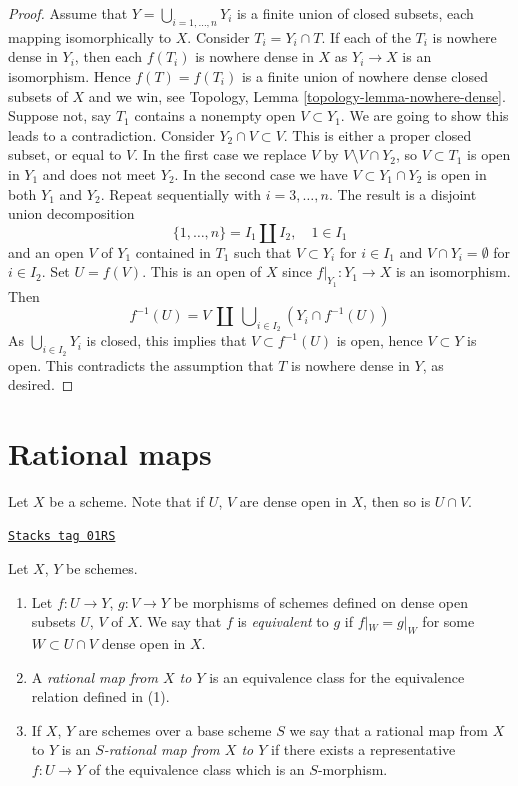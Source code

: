 \begin{proof}
\medskip\noindent
Assume that $Y = \bigcup_{i = 1, \ldots, n} Y_i$ is a finite union of
closed subsets, each mapping isomorphically to $X$. Consider
$T_i = Y_i \cap T$. If each of the $T_i$ is nowhere dense in $Y_i$,
then each $f(T_i)$ is nowhere dense in $X$ as $Y_i \to X$ is an isomorphism.
Hence $f(T) = f(T_i)$ is a finite union of nowhere dense closed
subsets of $X$ and we win, see
Topology, Lemma \ref{topology-lemma-nowhere-dense}.
Suppose not, say $T_1$ contains a nonempty open $V \subset Y_1$.
We are going to show this leads to a contradiction.
Consider $Y_2 \cap V \subset V$. This is either
a proper closed subset, or equal to $V$. In the first case we replace
$V$ by $V \setminus V \cap Y_2$, so $V \subset T_1$ is open in $Y_1$ and
does not meet $Y_2$. In the second case we have
$V \subset Y_1 \cap Y_2$ is open in both $Y_1$ and $Y_2$.
Repeat sequentially with $i = 3, \ldots, n$. The result is a disjoint
union decomposition
$$
\{1, \ldots, n\} = I_1 \amalg I_2, \quad 1 \in I_1
$$
and an open $V$ of $Y_1$ contained in $T_1$ such that $V \subset Y_i$
for $i \in I_1$ and $V \cap Y_i = \emptyset$ for $i \in I_2$. Set
$U = f(V)$. This is an open of $X$ since $f|_{Y_1} : Y_1 \to X$ is
an isomorphism. Then
$$
f^{-1}(U) = V\ \amalg\ \bigcup\nolimits_{i \in I_2} (Y_i \cap f^{-1}(U))
$$
As $\bigcup_{i \in I_2} Y_i$ is closed, this implies that
$V \subset f^{-1}(U)$ is open, hence $V \subset Y$ is open.
This contradicts the assumption that $T$ is nowhere dense in $Y$, as desired.
\end{proof}

\section{Rational maps}
\label{morphisms-section-rational-maps}
Let $X$ be a scheme. Note that if $U$, $V$ are dense open
in $X$, then so is $U \cap V$.

\begin{definition}
\label{morphisms-definition-rational-map}
\href{https://stacks.math.columbia.edu/tag/01RS}{\texttt{Stacks tag 01RS}}

Let $X$, $Y$ be schemes.
\begin{enumerate}
\item Let $f : U \to Y$, $g : V \to Y$ be morphisms of schemes defined
on dense open subsets $U$, $V$ of $X$. We say that $f$ is
{\it equivalent} to $g$ if $f|_W = g|_W$ for some $W \subset U \cap V$
dense open in $X$.
\item A {\it rational map from $X$ to $Y$}
is an equivalence class for the equivalence relation defined in (1).
\item If $X$, $Y$ are schemes over a base scheme $S$ we say that
a rational map from $X$ to $Y$ is an {\it $S$-rational map from $X$
to $Y$} if there exists a representative $f : U \to Y$ of the equivalence
class which is an $S$-morphism.
\end{enumerate}
\end{definition}

